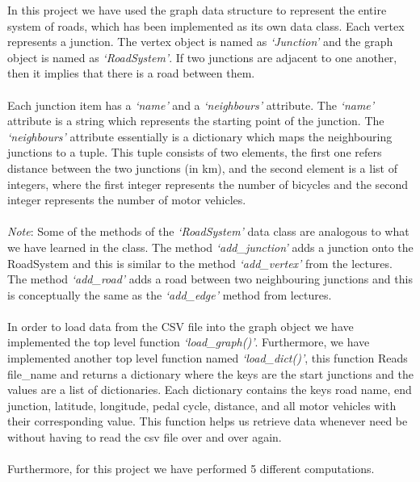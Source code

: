 \documentclass[fontsize=11pt]{IEEEtran}
\begin{document}
In this project we have used  the graph data structure to represent the entire system of roads,  which has been implemented as its own data class. Each vertex  represents a junction. The vertex object is named as \textit{‘Junction’} and the graph object is named as  \textit{‘RoadSystem’}. If two junctions are adjacent to one another, then it implies that there is a road between them.  \\
\\
Each junction item has a \textit{‘name’} and a \textit{‘neighbours’} attribute. The \textit{‘name’} attribute is a string which represents the starting point of the junction. The \textit{‘neighbours’} attribute  essentially is a dictionary which maps the  neighbouring junctions to a tuple. This tuple consists of two elements, the first one refers distance between the two junctions (in km), and the second element is a  list of integers, where the first integer represents the number of bicycles and the second integer represents the number of motor vehicles. \\  \\
\textit{Note}: Some of the methods of the \textit{‘RoadSystem’} data class are analogous to what we have learned in the class. The method \textit{‘add\_junction’} adds a junction onto the RoadSystem and this is similar to the method \textit{‘add\_vertex’} from the lectures. The method \textit{‘add\_road’} adds a road between two neighbouring junctions and this is conceptually the same as  the \textit{‘add\_edge’} method from lectures. \cite{2} \\
\\
In order to load data from the CSV file into the graph object we have implemented the top level function \textit{‘load\_graph()’}. Furthermore, we have implemented another top level function named \textit{‘load\_dict()’}, this function Reads file\_name and returns a dictionary where the keys are the start junctions and the values are a list of dictionaries. Each dictionary contains the keys road name, end junction,  latitude, longitude, pedal cycle, distance, and all motor vehicles with their corresponding value. This function helps us retrieve data whenever need be without having to read the csv file over and over again.
\\ \\
Furthermore, for this project we have performed 5 different computations.
\\
\end{document}
